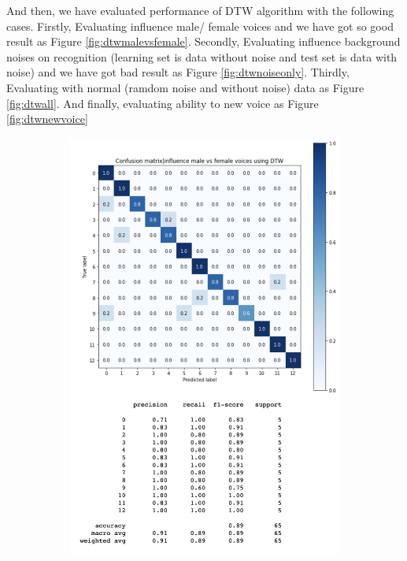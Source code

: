 \documentclass[%
  article,%
  10pt,%
  a4paper,%
  fleqn,%
  oneside,%
  sumario = tradicional,%
  chapter = TITLE,%
  section = TITLE,%
]{abntex2}
\begin{document}
And then, we have evaluated performance of DTW algorithm with the following cases. Firstly, Evaluating influence male/ female voices and we have got so good result as Figure \ref{fig:dtwmalevsfemale}. Secondly, Evaluating influence background noises on recognition (learning set is data without noise and test set is data with noise) and we have got bad result as Figure \ref{fig:dtwnoiseonly}. Thirdly, Evaluating with normal (ramdom noise and without noise) data as Figure \ref{fig:dtwall}. And finally, evaluating ability to new voice as Figure \ref{fig:dtwnewvoice}
\begin{figure}
\centering
\begin{minipage}[b]{.4\textwidth}
\begin{figure}[H]
  \centering
  \includegraphics[width = \columnwidth]{./Figuras/dtwmalefemale}

\end{figure}
\end{minipage}
\end{figure}
\end{document}
